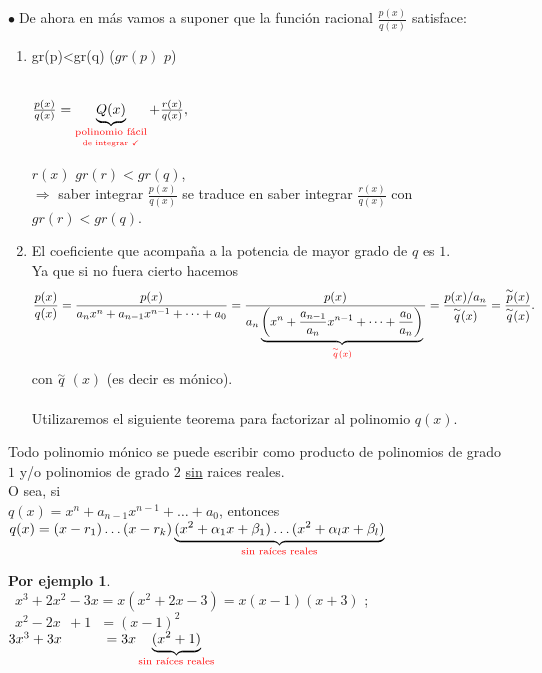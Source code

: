 \documentclass{article}
\theoremstyle{definition}
\theoremstyle{definition}
\newtheorem*{ej}{Por ejemplo}
\theoremstyle{remark}
\newcommand\bl{$\bullet\;$}
\newcommand\qtilde{\overset{\sim}{q}}
\begin{document}
\bl De ahora en más vamos a suponer que la función racional $\frac{p(x)}{q(x)}$ satisface:

\begin{enumerate}
  \item gr(p)<gr(q) \quad \quad \quad \big($gr(p)$  $p$\big) \\
  \\
\begin{center}
  $\frac{p(x)}{q(x)}=\underbrace{Q(x)}_{\textcolor{red}{\underset{\textcolor{red}{\text{de integrar $\checkmark$}}}{\textcolor{red}{\text{polinomio fácil}}}}}+\frac{r(x)}{q(x)},\quad$
\end{center}
   $r(x)$ \; \; $gr(r)<gr(q)$,\\
  $\Rightarrow$ saber integrar $\frac{p(x)}{q(x)}$ se traduce en saber integrar $\frac{r(x)}{q(x)}$ con $gr(r)<gr(q)$. \\
  \item El coeficiente que acompaña a la potencia de mayor grado de $q$ es $1$. \\
              Ya que si no fuera cierto hacemos
              \[
\frac{p(x)}{q(x)}=\frac{p(x)}{a_nx^n+a_{n-1}x^{n-1}+ \dots + a_0}=\frac{p(x)}{a_n\underbrace{\left(x^n+\frac{a_{n-1}}{a_n}x^{n-1}+\dots+\frac{a_0}{a_n}\right)}_{\textcolor{red}{\overset{\sim}{q}(x)}}{}}=\frac{p(x)/a_n}{\overset{\sim}{q}(x)}=\frac{\overset{\sim}{p}(x)}{\overset{\sim}{q}(x)}.
              \]
con $\qtilde$ $(x)$ (es decir es mónico).\\\\
Utilizaremos el siguiente teorema para factorizar al polinomio $q(x)$.
\end{enumerate} 
\pagebreak
\begin{teo}
  Todo polinomio mónico se puede escribir como producto de polinomios de grado $1$ y/o polinomios de grado $2$ \underline{sin} raices reales.\\
  O sea, si \\
  $q(x)=x^n+a_{n-1}x^{n-1}+\dots + a_0$, entonces \\
   $q(x)=(x-r_1)\dots(x-r_k)\underbrace{(x^2+\alpha_1x+\beta_1)\dots (x^2+\alpha_lx+\beta_l)}_{\text{\textcolor{red}{sin raíces reales}}}$
\end{teo}

\begin{ej} \; \\
  $\phantom{1}x^3+2x^2-3x=x(x^2+2x-3)=x(x-1)(x+3)$ ; \\
  $\phantom{1}x^2-2x\phantom{^x}+1\phantom{x}=(x-1)^2$ \\
  $3x^3+3x^{\phantom{x}}\phantom{-2xx}=3x\underbrace{(x^2+1)}_{\textcolor{red}{\text{sin raíces reales}}}$
\end{ej}
\end{document}
